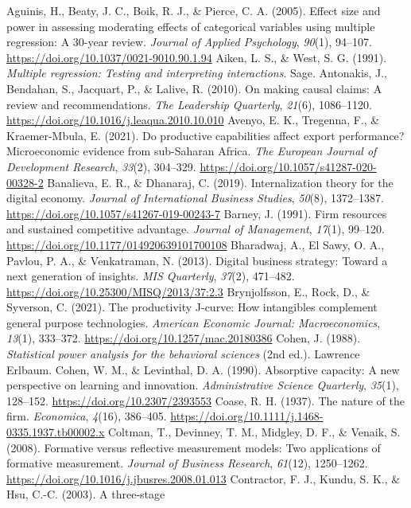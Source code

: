 \documentclass[12pt,a4paper]{article}
\begin{document}
Aguinis, H., Beaty, J. C., Boik, R. J., \& Pierce, C. A. (2005). Effect
size and power in assessing moderating effects of categorical variables
using multiple regression: A 30-year review. \emph{Journal of Applied
Psychology}, \emph{90}(1), 94--107.
\url{https://doi.org/10.1037/0021-9010.90.1.94} Aiken, L. S., \& West,
S. G. (1991). \emph{Multiple regression: Testing and interpreting
interactions}. Sage. Antonakis, J., Bendahan, S., Jacquart, P., \&
Lalive, R. (2010). On making causal claims: A review and
recommendations. \emph{The Leadership Quarterly}, \emph{21}(6),
1086--1120. \url{https://doi.org/10.1016/j.leaqua.2010.10.010} Avenyo,
E. K., Tregenna, F., \& Kraemer-Mbula, E. (2021). Do productive
capabilities affect export performance? Microeconomic evidence from
sub-Saharan Africa. \emph{The European Journal of Development Research},
\emph{33}(2), 304--329. \url{https://doi.org/10.1057/s41287-020-00328-2}
Banalieva, E. R., \& Dhanaraj, C. (2019). Internalization theory for the
digital economy. \emph{Journal of International Business Studies},
\emph{50}(8), 1372--1387.
\url{https://doi.org/10.1057/s41267-019-00243-7} Barney, J. (1991). Firm
resources and sustained competitive advantage. \emph{Journal of
Management}, \emph{17}(1), 99--120.
\url{https://doi.org/10.1177/014920639101700108} Bharadwaj, A., El Sawy,
O. A., Pavlou, P. A., \& Venkatraman, N. (2013). Digital business
strategy: Toward a next generation of insights. \emph{MIS Quarterly},
\emph{37}(2), 471--482. \url{https://doi.org/10.25300/MISQ/2013/37:2.3}
Brynjolfsson, E., Rock, D., \& Syverson, C. (2021). The productivity
J-curve: How intangibles complement general purpose technologies.
\emph{American Economic Journal: Macroeconomics}, \emph{13}(1),
333--372. \url{https://doi.org/10.1257/mac.20180386} Cohen, J. (1988).
\emph{Statistical power analysis for the behavioral sciences} (2nd ed.).
Lawrence Erlbaum. Cohen, W. M., \& Levinthal, D. A. (1990). Absorptive
capacity: A new perspective on learning and innovation.
\emph{Administrative Science Quarterly}, \emph{35}(1), 128--152.
\url{https://doi.org/10.2307/2393553} Coase, R. H. (1937). The nature of
the firm. \emph{Economica}, \emph{4}(16), 386--405.
\url{https://doi.org/10.1111/j.1468-0335.1937.tb00002.x} Coltman, T.,
Devinney, T. M., Midgley, D. F., \& Venaik, S. (2008). Formative versus
reflective measurement models: Two applications of formative
measurement. \emph{Journal of Business Research}, \emph{61}(12),
1250--1262. \url{https://doi.org/10.1016/j.jbusres.2008.01.013}
Contractor, F. J., Kundu, S. K., \& Hsu, C.-C. (2003). A three-stage
\end{document}
